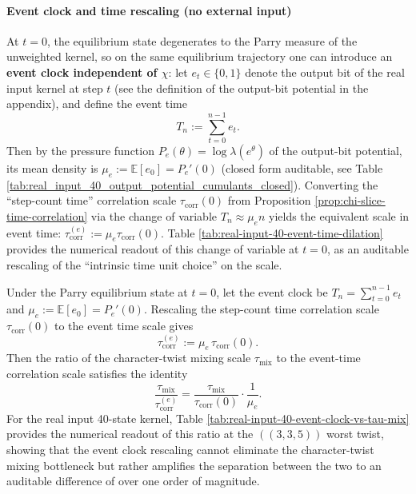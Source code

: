 \paragraph{Event clock and time rescaling (no external input)}
At $t=0$, the equilibrium state degenerates to the Parry measure of the unweighted kernel, so on the same equilibrium trajectory one can introduce an \textbf{event clock independent of $\chi$}: let $e_t\in\{0,1\}$ denote the output bit of the real input kernel at step $t$ (see the definition of the output-bit potential in the appendix), and define the event time
\[
T_n:=\sum_{t=0}^{n-1} e_t.
\]
Then by the pressure function $P_e(\theta)=\log\lambda(e^{\theta})$ of the output-bit potential, its mean density is $\mu_e:=\mathbb{E}[e_0]=P_e'(0)$ (closed form auditable, see Table \ref{tab:real_input_40_output_potential_cumulants_closed}).
Converting the ``step-count time'' correlation scale $\tau_{\mathrm{corr}}(0)$ from Proposition \ref{prop:chi-slice-time-correlation} via the change of variable $T_n\approx \mu_e n$ yields the equivalent scale in event time: $\tau_{\mathrm{corr}}^{(e)}:=\mu_e\tau_{\mathrm{corr}}(0)$.
Table \ref{tab:real-input-40-event-time-dilation} provides the numerical readout of this change of variable at $t=0$, as an auditable rescaling of the ``intrinsic time unit choice'' on the scale.



\begin{remark}\label{cor:chi-event-clock-amplifies-separation}
Under the Parry equilibrium state at $t=0$, let the event clock be $T_n=\sum_{t=0}^{n-1}e_t$ and $\mu_e:=\mathbb{E}[e_0]=P_e'(0)$.
Rescaling the step-count time correlation scale $\tau_{\mathrm{corr}}(0)$ to the event time scale gives
\[
\tau_{\mathrm{corr}}^{(e)}:=\mu_e\,\tau_{\mathrm{corr}}(0).
\]
Then the ratio of the character-twist mixing scale $\tau_{\mathrm{mix}}$ to the event-time correlation scale satisfies the identity
\[
\frac{\tau_{\mathrm{mix}}}{\tau_{\mathrm{corr}}^{(e)}}
=\frac{\tau_{\mathrm{mix}}}{\tau_{\mathrm{corr}}(0)}\cdot\frac{1}{\mu_e}.
\]
For the real input 40-state kernel, Table \ref{tab:real-input-40-event-clock-vs-tau-mix} provides the numerical readout of this ratio at the $((3,3,5))$ worst twist, showing that the event clock rescaling cannot eliminate the character-twist mixing bottleneck but rather amplifies the separation between the two to an auditable difference of over one order of magnitude.
\end{remark}

